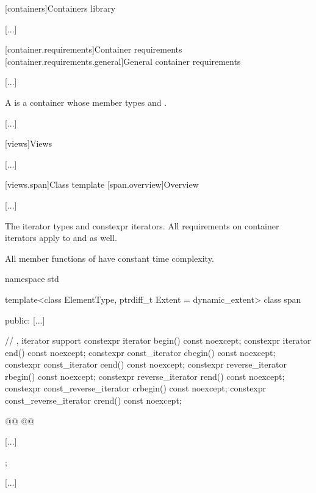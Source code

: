 
[containers]{Containers library}

[...]

\setcounter{section}{1}
[container.requirements]{Container requirements}
[container.requirements.general]{General container requirements}

[...]

\setcounter{Paras}{12}
\pnum
{}%
A 
is a container  whose member types  and 
.

[...]

\setcounter{section}{6}
[views]{Views}

[...]

\setcounter{subsection}{2}
[views.span]{Class template }
[span.overview]{Overview}

[...]

\setcounter{Paras}{1}
\pnum
The iterator types  and 
constexpr iterators.
All requirements on container iterators apply to
 and  as well.

\pnum
All member functions of  have constant time complexity.

%
\begin{codeblock}
namespace std {
  template<class ElementType, ptrdiff_t Extent = dynamic_extent>
  class span {
  public:
    [...]

    // , iterator support
    constexpr iterator begin() const noexcept;
    constexpr iterator end() const noexcept;
    constexpr const_iterator cbegin() const noexcept;
    constexpr const_iterator cend() const noexcept;
    constexpr reverse_iterator rbegin() const noexcept;
    constexpr reverse_iterator rend() const noexcept;
    constexpr const_reverse_iterator crbegin() const noexcept;
    constexpr const_reverse_iterator crend() const noexcept;

    @@
    @@

    [...]
  };
}
\end{codeblock}

[...]
